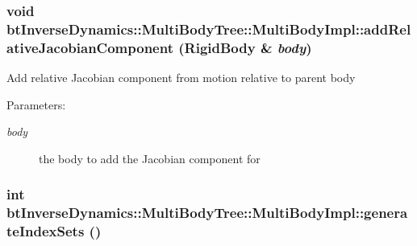  \hypertarget{classbt_inverse_dynamics_1_1_multi_body_tree_1_1_multi_body_impl_6facecec947e6b43378ba20e6b98eea7}{
\subsubsection[addRelativeJacobianComponent]{\setlength{\rightskip}{0pt plus 5cm}void btInverseDynamics::MultiBodyTree::MultiBodyImpl::addRelativeJacobianComponent ({\bf RigidBody} \& {\em body})}}
\label{classbt_inverse_dynamics_1_1_multi_body_tree_1_1_multi_body_impl_6facecec947e6b43378ba20e6b98eea7}


Add relative Jacobian component from motion relative to parent body \begin{Desc}
\item[Parameters:]
\begin{description}
\item[{\em body}]the body to add the Jacobian component for \end{description}
\end{Desc}
\hypertarget{classbt_inverse_dynamics_1_1_multi_body_tree_1_1_multi_body_impl_8e65f0c1da65e68e3a482862f3b866c7}{
\subsubsection[generateIndexSets]{\setlength{\rightskip}{0pt plus 5cm}int btInverseDynamics::MultiBodyTree::MultiBodyImpl::generateIndexSets ()}}
\label{classbt_inverse_dynamics_1_1_multi_body_tree_1_1_multi_body_impl_8e65f0c1da65e68e3a482862f3b866c7}


